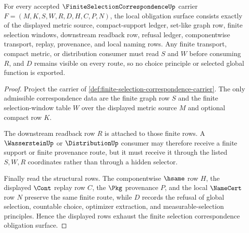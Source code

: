 \begin{theorem}
\label{thm:finite-selection-correspondence-obligation-surface}
For every accepted $\FiniteSelectionCorrespondenceUp$ carrier $F=(M,K,S,W,R,D,H,C,P,N)$, the local obligation surface consists exactly of the displayed metric source, compact-support ledger, set-like graph row, finite selection windows, downstream readback row, refusal ledger, componentwise transport, replay, provenance, and local naming rows. Any finite transport, compact metric, or distribution consumer must read $S$ and $W$ before consuming $R$, and $D$ remains visible on every route, so no choice principle or selected global function is exported.
\end{theorem}
\begin{proof}
Project the carrier of \autoref{def:finite-selection-correspondence-carrier}. The only admissible correspondence data are the finite graph row $S$ and the finite selection-window table $W$ over the displayed metric source $M$ and optional compact row $K$.

The downstream readback row $R$ is attached to those finite rows. A $\WassersteinUp$ or $\DistributionUp$ consumer may therefore receive a finite support or finite provenance route, but it must receive it through the listed $S,W,R$ coordinates rather than through a hidden selector.

Finally read the structural rows. The componentwise $\hsame$ row $H$, the displayed $\Cont$ replay row $C$, the $\Pkg$ provenance $P$, and the local $\NameCert$ row $N$ preserve the same finite route, while $D$ records the refusal of global selection, countable choice, optimizer extraction, and measurable-selection principles. Hence the displayed rows exhaust the finite selection correspondence obligation surface.
\end{proof}



